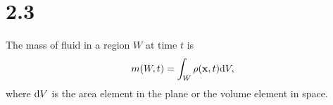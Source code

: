 \section{2.3}
\label{sec:2.3}

\begin{prop}
  The mass of fluid in a region $W$ at time $t$ is
  \begin{equation}
    \label{eq:totalMass}
    m(W,t) = \int_W\rho(\mathbf{x},t)\mathrm{d} V,
  \end{equation}
  where $\mathrm{d} V$ is the area element in the plane
  or the volume element in space.
\end{prop}

